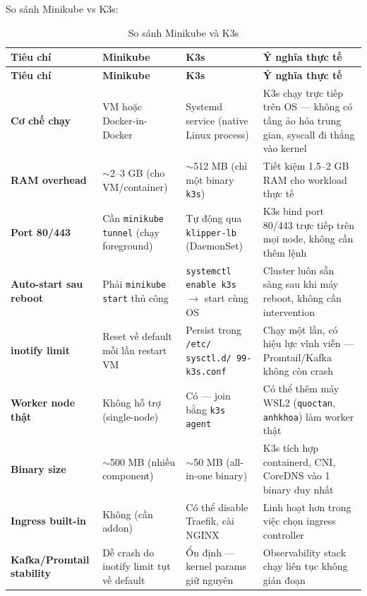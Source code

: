 So sánh Minikube vs K3s:
\renewcommand{\arraystretch}{1.4}
\begin{longtable}{|p{3.2cm}|p{3.2cm}|p{3.5cm}|p{6cm}|}
\caption{So sánh Minikube và K3s}
\label{tab:minikube-vs-k3s} \\
\hline
\textbf{Tiêu chí} & \textbf{Minikube} & \textbf{K3s} & \textbf{Ý nghĩa thực tế} \\
\hline
\endfirsthead
\hline
\textbf{Tiêu chí} & \textbf{Minikube} & \textbf{K3s} & \textbf{Ý nghĩa thực tế} \\
\hline
\endhead
\hline
\endfoot
\hline
\endlastfoot

\textbf{Cơ chế chạy} &
VM hoặc Docker-in-Docker &
Systemd service (native Linux process) &
K3s chạy trực tiếp trên OS — không có tầng ảo hóa trung gian, syscall đi thẳng vào kernel \\
\hline

\textbf{RAM overhead} &
$\sim$2--3 GB (cho VM/container) &
$\sim$512 MB (chỉ một binary \texttt{k3s}) &
Tiết kiệm 1.5--2 GB RAM cho workload thực tế \\
\hline

\textbf{Port 80/443} &
Cần \texttt{minikube tunnel} (chạy foreground) &
Tự động qua \texttt{klipper-lb} (DaemonSet) &
K3s bind port 80/443 trực tiếp trên mọi node, không cần thêm lệnh \\
\hline

\textbf{Auto-start sau reboot} &
Phải \texttt{minikube start} thủ công &
\texttt{systemctl enable k3s} $\rightarrow$ start cùng OS &
Cluster luôn sẵn sàng sau khi máy reboot, không cần intervention \\
\hline

\textbf{inotify limit} &
Reset về default mỗi lần restart VM &
Persist trong \texttt{/etc/ sysctl.d/ 99-k3s.conf} &
Chạy một lần, có hiệu lực vĩnh viễn — Promtail/Kafka không còn crash \\
\hline

\textbf{Worker node thật} &
Không hỗ trợ (single-node) &
Có — join bằng \texttt{k3s agent} &
Có thể thêm máy WSL2 (\texttt{quoctan}, \texttt{anhkhoa}) làm worker thật \\
\hline

\textbf{Binary size} &
$\sim$500 MB (nhiều component) &
$\sim$50 MB (all-in-one binary) &
K3s tích hợp containerd, CNI, CoreDNS vào 1 binary duy nhất \\
\hline

\textbf{Ingress built-in} &
Không (cần addon) &
Có thể disable Traefik, cài NGINX &
Linh hoạt hơn trong việc chọn ingress controller \\
\hline

\textbf{Kafka/Promtail stability} &
Dễ crash do inotify limit tụt về default &
Ổn định — kernel params giữ nguyên &
Observability stack chạy liên tục không gián đoạn \\
\hline

\end{longtable}

